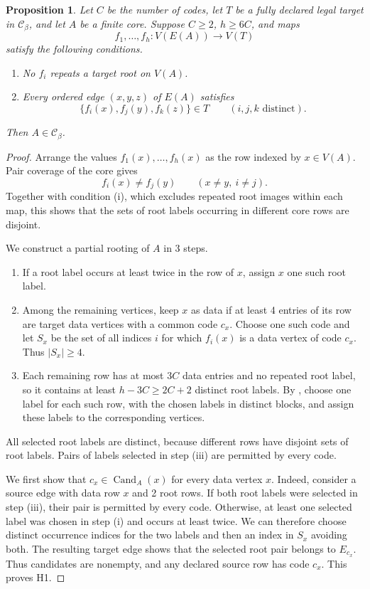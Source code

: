 \documentclass[10pt]{article}
\numberwithin{equation}{section}
\newtheorem{proposition}[proposition]{Proposition}\aliascntresetthe{proposition}
\theoremstyle{definition}
\newcommand{\Cand}{\operatorname{Cand}}
\begin{document}
\begin{proposition}
\label{thm:many-profile-ternary-reconstruction}
Let $C$ be the number of codes, let $T$ be a fully declared legal target in $\mathcal C_\beta$, and let $A$ be a finite core. Suppose $C\ge2$, $h\ge6C$, and maps
\[
 f_1,\ldots,f_h\colon V(E(A))\longrightarrow V(T)
\]
satisfy the following conditions.
\begin{enumerate}
\item No $f_i$ repeats a target root on $V(A)$.
\item Every ordered edge $(x,y,z)$ of $E(A)$ satisfies
\[
 \{f_i(x),f_j(y),f_k(z)\}\in T
 \qquad(i,j,k\text{ distinct}).
\]
\end{enumerate}
Then $A\in\mathcal C_\beta$.
\end{proposition}
\begin{proof}
Arrange the values $f_1(x),\ldots,f_h(x)$ as the row indexed by $x\in V(A)$. Pair coverage of the core gives
\begin{equation}
 f_i(x)\ne f_j(y)\qquad(x\ne y,\ i\ne j).
 \label{eq:ternary-cross-privacy}
\end{equation}
Together with condition (i), which excludes repeated root images within each map, this shows that the sets of root labels occurring in different core rows are disjoint.

We construct a partial rooting of $A$ in 3 steps.
\begin{enumerate}
\item If a root label occurs at least twice in the row of $x$, assign $x$ one such root label.
\item Among the remaining vertices, keep $x$ as data if at least 4 entries of its row are target data vertices with a common code $c_x$. Choose one such code and let $S_x$ be the set of all indices $i$ for which $f_i(x)$ is a data vertex of code $c_x$. Thus $|S_x|\ge4$.
\item Each remaining row has at most $3C$ data entries and no repeated root label, so it contains at least $h-3C\ge2C+2$ distinct root labels. By , choose one label for each such row, with the chosen labels in distinct blocks, and assign these labels to the corresponding vertices.
\end{enumerate}
All selected root labels are distinct, because different rows have disjoint sets of root labels. Pairs of labels selected in step \textup{(iii)} are permitted by every code.

We first show that $c_x\in\Cand_A(x)$ for every data vertex $x$. Indeed, consider a source edge with data row $x$ and 2 root rows. If both root labels were selected in step \textup{(iii)}, their pair is permitted by every code. Otherwise, at least one selected label was chosen in step \textup{(i)} and occurs at least twice. We can therefore choose distinct occurrence indices for the two labels and then an index in $S_x$ avoiding both. The resulting target edge shows that the selected root pair belongs to $E_{c_x}$. Thus candidates are nonempty, and any declared source row has code $c_x$. This proves H1.


\end{proof}
\end{document}
